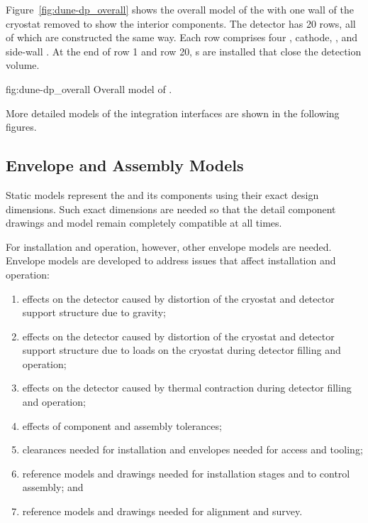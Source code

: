 Figure~\ref{fig:dune-dp_overall} shows the overall model of the  with one wall of the cryostat  removed to
show the interior components. The detector has 20 rows, all of which
are constructed the same way. Each row comprises four ,
cathode, ,  and side-wall .  At the
end of row 1 and row 20, \endwall{}s are installed that close the
detection volume.
\begin{dunefigure}{fig:dune-dp_overall}
  {Overall model of  .}
\end{dunefigure}


More detailed models of the  integration
interfaces are shown in the following figures.

\subsection{Envelope and Assembly Models}
\label{sec:fdsp-coord-integ-envelope}

Static models represent the  and its components using their exact
design dimensions. Such exact dimensions are needed so that the
detail component drawings and model remain completely compatible at all
times.


For installation and operation, however, other envelope models are
needed. Envelope models are developed to address issues that affect
installation and operation:
\begin{enumerate}
 \item effects on the detector caused by distortion of the cryostat
   and detector support structure due to gravity;
 \item effects on the detector caused by distortion of the cryostat
   and detector support structure due to loads on the cryostat during
   detector filling and operation;
 \item effects on the detector caused by thermal contraction during
   detector filling and operation;
 \item effects of component and
   assembly tolerances;
 \item clearances needed for installation and envelopes needed for
   access and tooling;
 \item reference models and drawings needed for installation stages
   and to control assembly; and
 \item reference models and drawings needed for alignment and survey.
\end{enumerate}


